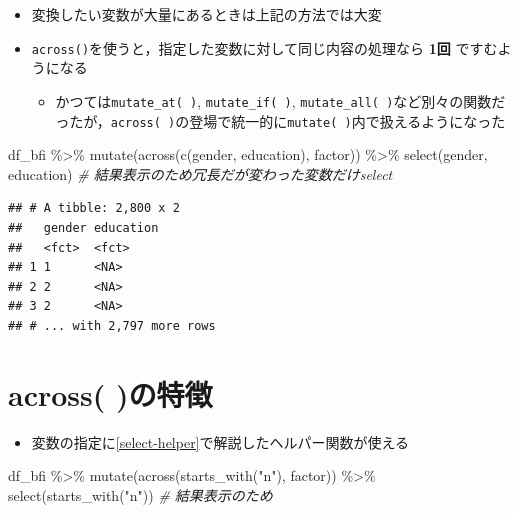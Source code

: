 \documentclass[
  xelatex,ja=standard, b5paper]{bxjsbook}
\newenvironment{Shaded}{\begin{snugshade}}{\end{snugshade}}
\newcommand{\CommentTok}[1]{\textcolor[rgb]{0.56,0.35,0.01}{\textit{#1}}}
\newcommand{\FunctionTok}[1]{\textcolor[rgb]{0.00,0.00,0.00}{#1}}
\newcommand{\NormalTok}[1]{#1}
\newcommand{\SpecialCharTok}[1]{\textcolor[rgb]{0.00,0.00,0.00}{#1}}
\newcommand{\StringTok}[1]{\textcolor[rgb]{0.31,0.60,0.02}{#1}}
\providecommand{\tightlist}{%
  \setlength{\itemsep}{0pt}\setlength{\parskip}{0pt}}
\begin{document}
\begin{itemize}
\tightlist
\item
  変換したい変数が大量にあるときは上記の方法では大変
\item
  \texttt{across()}を使うと，指定した変数に対して同じ内容の処理なら \textbf{1回} ですむようになる

  \begin{itemize}
  \tightlist
  \item
    かつては\texttt{mutate\_at(\ )}, \texttt{mutate\_if(\ )}, \texttt{mutate\_all(\ )}など別々の関数だったが，\texttt{across(\ )}の登場で統一的に\texttt{mutate(\ )}内で扱えるようになった
  \end{itemize}
\end{itemize}

\begin{Shaded}
\begin{Highlighting}[]
\NormalTok{df\_bfi }\SpecialCharTok{\%\textgreater{}\%}
  \FunctionTok{mutate}\NormalTok{(}\FunctionTok{across}\NormalTok{(}\FunctionTok{c}\NormalTok{(gender, education),}
\NormalTok{                factor)) }\SpecialCharTok{\%\textgreater{}\%} 
  \FunctionTok{select}\NormalTok{(gender, education)   }\CommentTok{\# 結果表示のため冗長だが変わった変数だけselect}
\end{Highlighting}
\end{Shaded}

\begin{verbatim}
## # A tibble: 2,800 x 2
##   gender education
##   <fct>  <fct>    
## 1 1      <NA>     
## 2 2      <NA>     
## 3 2      <NA>     
## # ... with 2,797 more rows
\end{verbatim}

\hypertarget{mu-across}{%
\section{across( )の特徴}\label{mu-across}}

\begin{itemize}
\tightlist
\item
  変数の指定に\ref{select-helper}で解説したヘルパー関数が使える
\end{itemize}

\begin{Shaded}
\begin{Highlighting}[]
\NormalTok{df\_bfi }\SpecialCharTok{\%\textgreater{}\%}
  \FunctionTok{mutate}\NormalTok{(}\FunctionTok{across}\NormalTok{(}\FunctionTok{starts\_with}\NormalTok{(}\StringTok{"n"}\NormalTok{),}
\NormalTok{                factor)) }\SpecialCharTok{\%\textgreater{}\%} 
  \FunctionTok{select}\NormalTok{(}\FunctionTok{starts\_with}\NormalTok{(}\StringTok{"n"}\NormalTok{))   }\CommentTok{\# 結果表示のため}
\end{Highlighting}
\end{Shaded}
\end{document}
